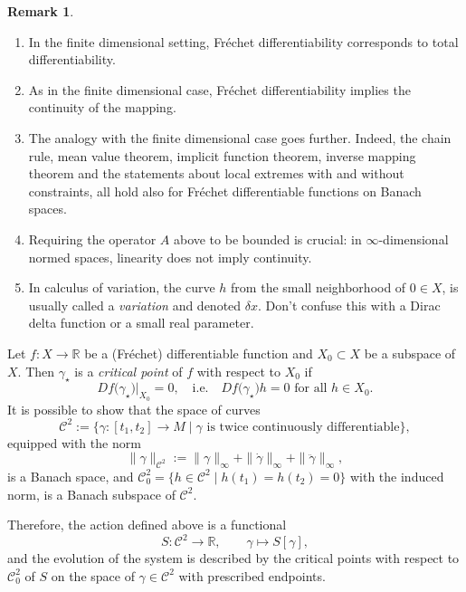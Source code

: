 \documentclass[english,fontsize=11pt,paper=b5]{scrbook}
\theoremstyle{definition}
\newtheorem{remark}{Remark}[chapter]
\newcommand{\emphidx}[1]{\index{#1}\emph{#1}}
\begin{document}
  \begin{remark}
    \begin{enumerate}
      \item In the finite dimensional setting, Fr\'echet differentiability corresponds to total differentiability.
      \item As in the finite dimensional case, Fr\'echet differentiability implies the continuity of the mapping.
      \item The analogy with the finite dimensional case goes further. Indeed, the chain rule, mean value theorem, implicit function theorem, inverse mapping theorem and the statements about local extremes with and without constraints, all hold also for Fr\'echet differentiable functions on Banach spaces.
      \item Requiring the operator $A$ above to be bounded is crucial: in $\infty$-dimensional normed spaces, linearity does not imply continuity.
      \item In calculus of variation, the curve $h$ from the small neighborhood of $0\in X$, is usually called a \emphidx{variation} and denoted $\delta x$. Don't confuse this with a Dirac delta function or a small real parameter.
    \end{enumerate}
  \end{remark}

  Let $f: X \to \mathbb{R}$ be a (Fr\'echet) differentiable function and $X_0 \subset X$ be a subspace of $X$. Then $\gamma_\star$ is a \emph{critical point}  of $f$ with respect to $X_0$ if
  \begin{equation}
    Df\big(\gamma_\star\big)\Big|_{X_0} = 0, \quad\mbox{i.e.}\quad
    Df\big(\gamma_\star\big)h = 0 \mbox{ for all } h\in X_0.
  \end{equation}
  It is possible to show that the space of curves
  \begin{equation}
    \mathcal{C}^2 := \big\{ \gamma: [t_1, t_2] \to M \mid \gamma \mbox{ is twice continuously differentiable}\big\},
  \end{equation} equipped with the norm
  \begin{equation}
    \|\gamma\|_{\mathcal{C}^2} :=
    \|\gamma\|_\infty + \|\dot \gamma\|_\infty + \|\ddot \gamma\|_\infty,
  \end{equation}
  is a Banach space, and $\mathcal{C}^2_0 = \big\{h\in \mathcal{C}^2 \mid h(t_1) = h(t_2) = 0\big\}$ with the induced norm, is a Banach subspace of $\mathcal{C}^2$.

  Therefore, the action defined above is a functional
  \begin{equation}
    S : \mathcal{C}^2 \to \mathbb{R},\qquad \gamma \mapsto S[\gamma],
  \end{equation}
  and the evolution of the system is described by the critical points with respect to $\mathcal{C}^2_0$ of $S$ on the space of $\gamma \in \mathcal{C}^2$ with prescribed endpoints.
\end{document}
